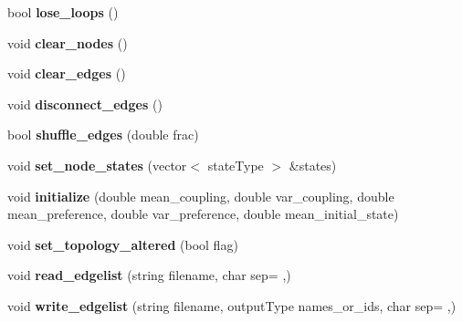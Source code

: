 \begin{DoxyCompactItemize}
\item 
\hypertarget{classNetwork_abde72ca35cf99ff927385c8f7843490f}{}bool {\bfseries lose\+\_\+loops} ()\label{classNetwork_abde72ca35cf99ff927385c8f7843490f}

\item 
\hypertarget{classNetwork_af8886395b3c292a670c7ffed1610448e}{}void {\bfseries clear\+\_\+nodes} ()\label{classNetwork_af8886395b3c292a670c7ffed1610448e}

\item 
\hypertarget{classNetwork_a80e6909a2fcf656ae8f720920b7a721d}{}void {\bfseries clear\+\_\+edges} ()\label{classNetwork_a80e6909a2fcf656ae8f720920b7a721d}

\item 
\hypertarget{classNetwork_a1d655233d6f1e7e976eb72c28d7ffe02}{}void {\bfseries disconnect\+\_\+edges} ()\label{classNetwork_a1d655233d6f1e7e976eb72c28d7ffe02}

\item 
\hypertarget{classNetwork_aeae904a08d9d5e7f8b8735a06f0d96f9}{}bool {\bfseries shuffle\+\_\+edges} (double frac)\label{classNetwork_aeae904a08d9d5e7f8b8735a06f0d96f9}

\item 
\hypertarget{classNetwork_af00312d958665700967525224eaf3171}{}void {\bfseries set\+\_\+node\+\_\+states} (vector$<$ state\+Type $>$ \&states)\label{classNetwork_af00312d958665700967525224eaf3171}

\item 
\hypertarget{classNetwork_adabe89c6c5d79192e5149aab1c79686d}{}void {\bfseries initialize} (double mean\+\_\+coupling, double var\+\_\+coupling, double mean\+\_\+preference, double var\+\_\+preference, double mean\+\_\+initial\+\_\+state)\label{classNetwork_adabe89c6c5d79192e5149aab1c79686d}

\item 
\hypertarget{classNetwork_a5be5e3f143bc528d37c49e0406b7b039}{}void {\bfseries set\+\_\+topology\+\_\+altered} (bool flag)\label{classNetwork_a5be5e3f143bc528d37c49e0406b7b039}

\item 
\hypertarget{classNetwork_a7daffc01be38d41fb0bf8de762e12642}{}void {\bfseries read\+\_\+edgelist} (string filename, char sep= \textquotesingle{},\textquotesingle{})\label{classNetwork_a7daffc01be38d41fb0bf8de762e12642}

\item 
\hypertarget{classNetwork_a7955ccfdf8578129ff7d78b68b9b70e3}{}void {\bfseries write\+\_\+edgelist} (string filename, output\+Type names\+\_\+or\+\_\+ids, char sep= \textquotesingle{},\textquotesingle{})\label{classNetwork_a7955ccfdf8578129ff7d78b68b9b70e3}


\end{DoxyCompactItemize}
